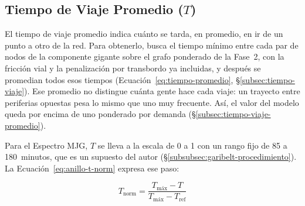 %
%
\subsection{Tiempo de Viaje Promedio (\texorpdfstring{$T$}{T})}
\label{subsec:anillo-tiempo-viaje}

El tiempo de viaje promedio indica cuánto se tarda, en promedio, en ir de un
punto a otro de la red. Para obtenerlo, \dijkstra{} busca el tiempo mínimo entre
cada par de nodos de la componente gigante sobre el grafo ponderado de la
Fase~2, con la fricción vial y la penalización por transbordo ya incluidas, y
después se promedian todos esos tiempos (Ecuación~\eqref{eq:tiempo-promedio},
§\ref{subsec:tiempo-viaje}). Ese promedio no distingue cuánta gente hace cada
viaje: un trayecto entre periferias opuestas pesa lo mismo que uno muy
frecuente. Así, el valor del modelo queda por encima de uno ponderado por
demanda (§\ref{subsec:tiempo-viaje-promedio}).

Para el Espectro MJG, $T$ se lleva a la escala de 0 a 1 con un rango fijo de
85 a 180~minutos, que es un supuesto del autor
(§\ref{subsubsec:garibelt-procedimiento}). La
Ecuación~\eqref{eq:anillo-t-norm} expresa ese paso:

\begin{equation}
    T_{\text{norm}} = \frac{T_{\text{máx}} - T}{T_{\text{máx}} - T_{\text{ref}}}
    \label{eq:anillo-t-norm}
\end{equation}

